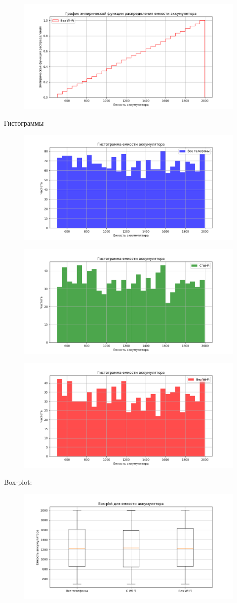 \documentclass{article}
\begin{document}
\begin{figure}[H]
      \centering
      \includegraphics[width=0.5\linewidth]{Python/emper-without-wifi}\label{fig:figure6}
\end{figure}

Гистограммы
\begin{figure}[H]
      \centering
      \includegraphics[width=0.5\linewidth]{Python/hist-all-phones}\label{fig:figure7}
\end{figure}

\begin{figure}[H]
      \centering
      \includegraphics[width=0.5\linewidth]{Python/hist-wi-fi}\label{fig:figure8}
\end{figure}

\begin{figure}[H]
      \centering
      \includegraphics[width=0.5\linewidth]{Python/hist-without-wi-fi}\label{fig:figure9}
\end{figure}

Box-plot:
\begin{figure}[H]
      \centering
      \includegraphics[width=0.5\linewidth]{Python/box-plot}\label{fig:figure10}
\end{figure}
\end{document}
